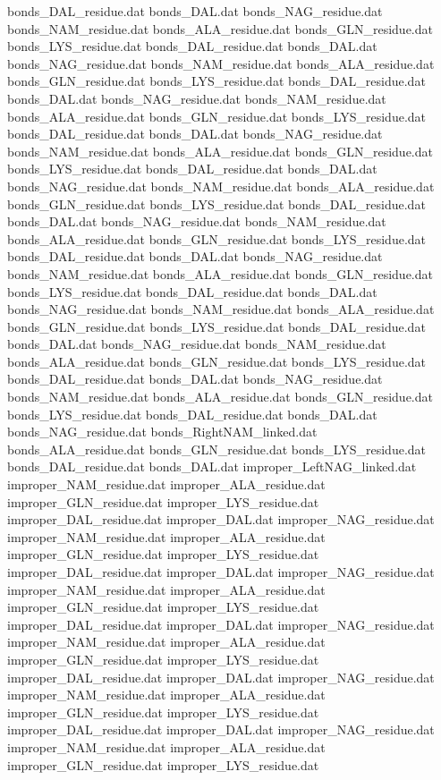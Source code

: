 bonds_DAL_residue.dat
bonds_DAL.dat
bonds_NAG_residue.dat
bonds_NAM_residue.dat
bonds_ALA_residue.dat
bonds_GLN_residue.dat
bonds_LYS_residue.dat
bonds_DAL_residue.dat
bonds_DAL.dat
bonds_NAG_residue.dat
bonds_NAM_residue.dat
bonds_ALA_residue.dat
bonds_GLN_residue.dat
bonds_LYS_residue.dat
bonds_DAL_residue.dat
bonds_DAL.dat
bonds_NAG_residue.dat
bonds_NAM_residue.dat
bonds_ALA_residue.dat
bonds_GLN_residue.dat
bonds_LYS_residue.dat
bonds_DAL_residue.dat
bonds_DAL.dat
bonds_NAG_residue.dat
bonds_NAM_residue.dat
bonds_ALA_residue.dat
bonds_GLN_residue.dat
bonds_LYS_residue.dat
bonds_DAL_residue.dat
bonds_DAL.dat
bonds_NAG_residue.dat
bonds_NAM_residue.dat
bonds_ALA_residue.dat
bonds_GLN_residue.dat
bonds_LYS_residue.dat
bonds_DAL_residue.dat
bonds_DAL.dat
bonds_NAG_residue.dat
bonds_NAM_residue.dat
bonds_ALA_residue.dat
bonds_GLN_residue.dat
bonds_LYS_residue.dat
bonds_DAL_residue.dat
bonds_DAL.dat
bonds_NAG_residue.dat
bonds_NAM_residue.dat
bonds_ALA_residue.dat
bonds_GLN_residue.dat
bonds_LYS_residue.dat
bonds_DAL_residue.dat
bonds_DAL.dat
bonds_NAG_residue.dat
bonds_NAM_residue.dat
bonds_ALA_residue.dat
bonds_GLN_residue.dat
bonds_LYS_residue.dat
bonds_DAL_residue.dat
bonds_DAL.dat
bonds_NAG_residue.dat
bonds_NAM_residue.dat
bonds_ALA_residue.dat
bonds_GLN_residue.dat
bonds_LYS_residue.dat
bonds_DAL_residue.dat
bonds_DAL.dat
bonds_NAG_residue.dat
bonds_NAM_residue.dat
bonds_ALA_residue.dat
bonds_GLN_residue.dat
bonds_LYS_residue.dat
bonds_DAL_residue.dat
bonds_DAL.dat
bonds_NAG_residue.dat
bonds_RightNAM_linked.dat
bonds_ALA_residue.dat
bonds_GLN_residue.dat
bonds_LYS_residue.dat
bonds_DAL_residue.dat
bonds_DAL.dat
improper_LeftNAG_linked.dat
improper_NAM_residue.dat
improper_ALA_residue.dat
improper_GLN_residue.dat
improper_LYS_residue.dat
improper_DAL_residue.dat
improper_DAL.dat
improper_NAG_residue.dat
improper_NAM_residue.dat
improper_ALA_residue.dat
improper_GLN_residue.dat
improper_LYS_residue.dat
improper_DAL_residue.dat
improper_DAL.dat
improper_NAG_residue.dat
improper_NAM_residue.dat
improper_ALA_residue.dat
improper_GLN_residue.dat
improper_LYS_residue.dat
improper_DAL_residue.dat
improper_DAL.dat
improper_NAG_residue.dat
improper_NAM_residue.dat
improper_ALA_residue.dat
improper_GLN_residue.dat
improper_LYS_residue.dat
improper_DAL_residue.dat
improper_DAL.dat
improper_NAG_residue.dat
improper_NAM_residue.dat
improper_ALA_residue.dat
improper_GLN_residue.dat
improper_LYS_residue.dat
improper_DAL_residue.dat
improper_DAL.dat
improper_NAG_residue.dat
improper_NAM_residue.dat
improper_ALA_residue.dat
improper_GLN_residue.dat
improper_LYS_residue.dat
